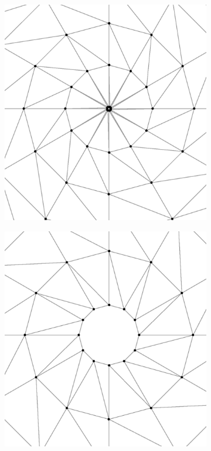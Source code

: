 \documentclass[./main.tex]{subfiles}
\begin{document}
\begin{figure}[!ht]
	\begin{subfigure}[b]{0.45\textwidth}
		\centering
		\includegraphics[width=1.0\textwidth]{figures/Comparison_smin_annulus_a.eps}
		\captionsetup{width=.4\textwidth}
		\caption{}
		\label{fig:Annulus_Plot_a}
	\end{subfigure}
	\hspace{1cm}
	\begin{subfigure}[b]{0.45\textwidth}
		\includegraphics[width=1.0\textwidth]{figures/Comparison_smin_annulus_b.eps}

\end{subfigure}
\end{figure}
\end{document}
